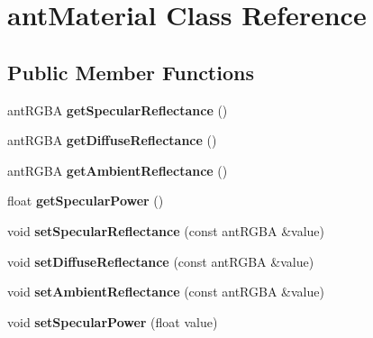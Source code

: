 \hypertarget{classant_material}{\section{ant\+Material Class Reference}
\label{classant_material}
}
\subsection*{Public Member Functions}
\begin{DoxyCompactItemize}
\item 
\hypertarget{classant_material_a39e537bb5b770dc2710b09cdf02c0b16}{ant\+R\+G\+B\+A {\bfseries get\+Specular\+Reflectance} ()}\label{classant_material_a39e537bb5b770dc2710b09cdf02c0b16}

\item 
\hypertarget{classant_material_af4e486230220aba0f2e9d4c1c515aa9d}{ant\+R\+G\+B\+A {\bfseries get\+Diffuse\+Reflectance} ()}\label{classant_material_af4e486230220aba0f2e9d4c1c515aa9d}

\item 
\hypertarget{classant_material_ac075f74d1c1bc402ba655140904fb4fd}{ant\+R\+G\+B\+A {\bfseries get\+Ambient\+Reflectance} ()}\label{classant_material_ac075f74d1c1bc402ba655140904fb4fd}

\item 
\hypertarget{classant_material_a87e7493d467c9e7008395ef5f43c1895}{float {\bfseries get\+Specular\+Power} ()}\label{classant_material_a87e7493d467c9e7008395ef5f43c1895}

\item 
\hypertarget{classant_material_a5b8e934583f81b24da20e073b3068408}{void {\bfseries set\+Specular\+Reflectance} (const ant\+R\+G\+B\+A \&value)}\label{classant_material_a5b8e934583f81b24da20e073b3068408}

\item 
\hypertarget{classant_material_ae868dd2aa6ebdc26732533fcb3b2145a}{void {\bfseries set\+Diffuse\+Reflectance} (const ant\+R\+G\+B\+A \&value)}\label{classant_material_ae868dd2aa6ebdc26732533fcb3b2145a}

\item 
\hypertarget{classant_material_a479ae92d57e1b54f5247b8d8d232c195}{void {\bfseries set\+Ambient\+Reflectance} (const ant\+R\+G\+B\+A \&value)}\label{classant_material_a479ae92d57e1b54f5247b8d8d232c195}

\item 
\hypertarget{classant_material_a52529883db1ad71eb32198062a8f8d43}{void {\bfseries set\+Specular\+Power} (float value)}\label{classant_material_a52529883db1ad71eb32198062a8f8d43}

\end{DoxyCompactItemize}
